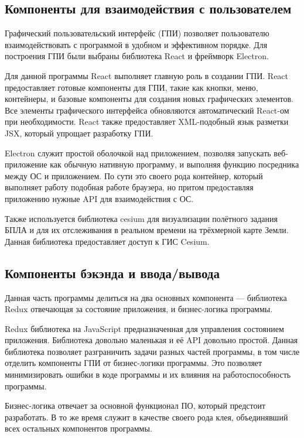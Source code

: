 \documentclass[specification,annotation]{itmo-student-thesis}
\begin{document}
\subsection{Компоненты для взаимодействия с пользователем}\label{subsec:uicomps}

Графический пользовательский интерфейс (ГПИ) позволяет пользователю
взаимодействовать с программой в удобном и эффективном порядке. Для построения
ГПИ были выбраны библиотека React и фреймворк Electron.

Для данной программы React выполняет главную роль в создании ГПИ. React
предоставляет готовые компоненты для ГПИ, такие как кнопки, меню, контейнеры, и
базовые компоненты для создания новых графических элементов. Все элементы
графического интерфейса обновляются автоматический React-ом при необходимости.
React также предоставляет XML-подобный язык разметки JSX, который упрощает
разработку ГПИ.

Electron служит простой оболочкой над приложением, позволяя запускать
веб-приложение как обычную нативную программу, и выполняя функцию посредника
между ОС и приложением. По сути это своего рода контейнер, который выполняет
работу подобная работе браузера, но притом предоставляя приложению нужные API
для взаимодействия с ОС.

Также используется библиотека cesium для визуализации полётного задания БПЛА и
для их отслеживания в реальном времени на трёхмерной карте Земли. Данная
библиотека предоставляет доступ к ГИС Cesium.

\subsection{Компоненты бэкэнда и ввода/вывода}\label{subsec:infocomps}

Данная часть программы делиться на два основных компонента --- библиотека Redux
отвечающая за состояние приложения, и бизнес-логика программы.

Redux библиотека на JavaScript предназначенная для управления состоянием
приложения. Библиотека довольно маленькая и её API довольно простой. Данная
библиотека позволяет разграничить задачи разных частей программы, в том числе
отделить компоненты ГПИ от бизнес-логики программы. Это позволяет минимизировать
ошибки в коде программы и их влияния на работоспособность программы.

Бизнес-логика отвечает за основной функционал ПО, который предстоит разработать.
В то же время служит в качестве своего рода клея, объединявший всех остальных
компонентов программы.
\end{document}
